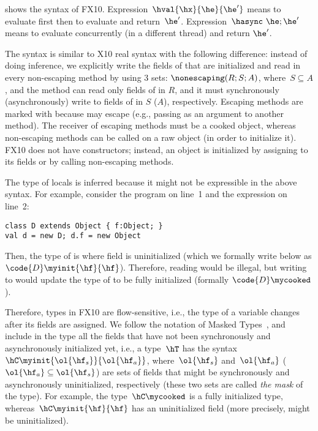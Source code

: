  shows the syntax of FX10.
Expression~$\hval{\hx}{\he}{\he'}$ means to evaluate first \he then to evaluate and return~$\he'$.
Expression~$\hasync~\he;\he'$ means to evaluate \he concurrently (in a different thread) and return $\he'$.

The syntax is similar to X10 real syntax with the following difference:
    instead of doing inference, we explicitly write the fields of \this that are initialized and read in
    every non-escaping method by
    using 3 sets: $\nonescaping(R;S;A)$, where~$S \subseteq A$,
    and the method can read only fields of \this in $R$,
    and it must synchronously (asynchronously) write to fields of \this in $S$ ($A$), respectively.
Escaping methods are marked with \hescaping
    because \this may escape (e.g., passing \this as an argument to another method).
The receiver of escaping methods must be a cooked object,
    whereas non-escaping methods can be called on a raw object (in order to initialize it).
FX10 does not have constructors; instead, an object is initialized by assigning to its fields or
    by calling
    non-escaping methods.

The type of  locals is inferred because it might not be expressible in the above syntax.
For example, consider the program on line~1 and the expression on line~2:
\begin{lstlisting}
class D extends Object { f:Object; }
val d = new D; d.f = new Object
\end{lstlisting}
Then, the type of  is  where field  is uninitialized
    (which we formally write below as $\code{D}\myinit{\hf}{\hf}$).
Therefore, reading  would be illegal, but writing to  would update the type of 
    to be fully initialized (formally $\code{D}\mycooked$).

Therefore, types in FX10 are flow-sensitive, i.e., the type of a variable changes after its fields are assigned.
We follow the notation of Masked Types~\cite{XinQi:2009}, and include in the type all the
    fields that have not been synchronously and asynchronously initialized yet,
    i.e., a type~$\hT$ has the syntax~$\hC\myinit{\ol{\hf_s}}{\ol{\hf_a}}$,
        where~$\ol{\hf_s}$ and~$\ol{\hf_a}$ ($\ol{\hf_a} \subseteq \ol{\hf_s}$)
        are sets of fields that might
        be synchronously and asynchronously uninitialized, respectively
        (these two sets are called \emph{the mask} of the type).
For example, the type~$\hC\mycooked$ is a fully initialized type,
    whereas~$\hC\myinit{\hf}{\hf}$ has an uninitialized field \hf
    (more precisely, \hf might be uninitialized).

